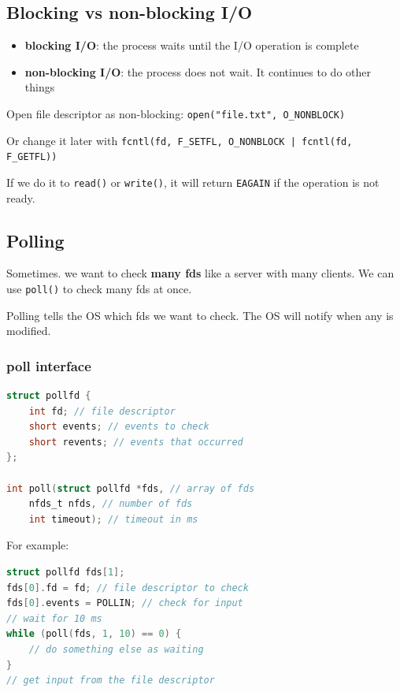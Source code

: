 \documentclass[letterpaper,12pt]{article}
\begin{document}
\subsection{Blocking vs non-blocking I/O}
\begin{itemize}
    \item \textbf{blocking I/O}: the process waits until the I/O operation is complete
    \item \textbf{non-blocking I/O}: the process does not wait. It continues to do other things
\end{itemize}
Open file descriptor as non-blocking: \texttt{open("file.txt", O\_NONBLOCK)}

Or change it later with \texttt{fcntl(fd, F\_SETFL, O\_NONBLOCK | fcntl(fd, F\_GETFL))}

If we do it to \texttt{read()} or \texttt{write()}, it will return \texttt{EAGAIN} if the operation is not ready.
\subsection{Polling}
Sometimes. we want to check \textbf{many fds} like a server with many clients. We can use \texttt{poll()} to check many fds at once.

Polling tells the OS which fds we want to check. The OS will notify when any is modified.

\subsubsection{poll interface}
\begin{lstlisting}[language=C]
struct pollfd {
    int fd; // file descriptor
    short events; // events to check
    short revents; // events that occurred
};

int poll(struct pollfd *fds, // array of fds
    nfds_t nfds, // number of fds
    int timeout); // timeout in ms
\end{lstlisting}
For example: \begin{lstlisting}[language=C]
struct pollfd fds[1];
fds[0].fd = fd; // file descriptor to check
fds[0].events = POLLIN; // check for input
// wait for 10 ms
while (poll(fds, 1, 10) == 0) {
    // do something else as waiting
}
// get input from the file descriptor
\end{lstlisting}
\end{document}
